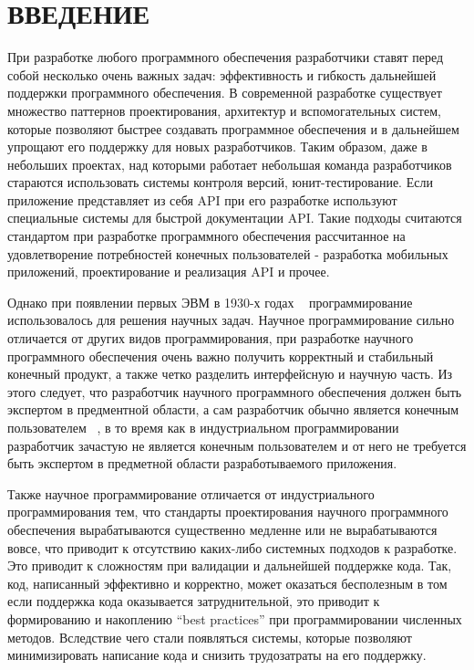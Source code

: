 \chapter*{ВВЕДЕНИЕ}\label{chap.introduction}


При разработке любого программного обеспечения разработчики ставят перед собой несколько очень важных задач: эффективность и гибкость дальнейшей поддержки программного обеспечения. В современной разработке существует множество паттернов проектирования, архитектур и вспомогательных систем, которые позволяют быстрее создавать программное обеспечения и в дальнейшем упрощают его поддержку для новых разработчиков. Таким образом, даже в небольших проектах, над которыми работает небольшая команда разработчиков стараются использовать системы контроля версий, юнит-тестирование. Если приложение представляет из себя API при его разработке используют специальные системы для быстрой документации API. Такие подходы считаются стандартом при разработке программного обеспечения рассчитанное на удовлетворение потребностей конечных пользователей - разработка мобильных приложений, проектирование и реализация API и прочее.

Однако при появлении первых ЭВМ в 1930-х годах ~\cite{FirstComputers} программирование использовалось для решения научных задач. Научное программирование сильно отличается от других видов программирования, при разработке научного программного обеспечения очень важно получить корректный и стабильный конечный продукт, а также четко разделить интерфейсную и научную часть. Из этого следует, что разработчик научного программного обеспечения должен быть экспертом в предментной области, а сам разработчик обычно является конечным пользователем ~\cite{ScientificDevelopment}, в то время как в индустриальном программировании разработчик зачастую не является конечным пользователем и от него не требуется быть экспертом в предметной области разработываемого приложения.

Также научное программирование отличается от индустриального программирования тем, что стандарты проектирования научного программного обеспечения вырабатываются существенно медленне или не вырабатываются вовсе, что приводит к отсутствию каких-либо системных подходов к разработке. Это приводит к сложностям при валидации и дальнейшей поддержке кода. Так, код, написанный эффективно и корректно, может оказаться бесполезным в том  если поддержка кода оказывается затруднительной, это приводит к формированию и накоплению ``best practices'' при программировании численных методов. Вследствие чего стали появляться системы, которые позволяют минимизировать написание кода и снизить трудозатраты на его поддержку. 

